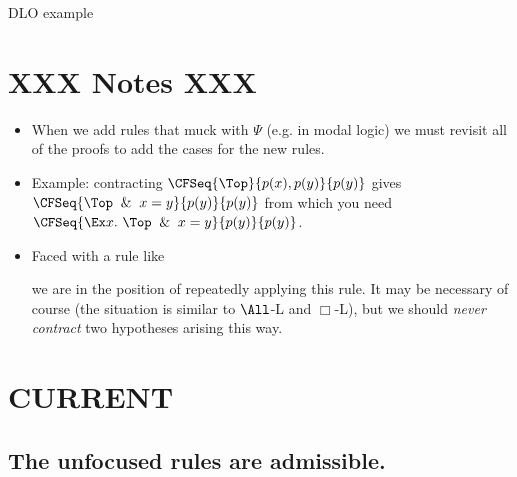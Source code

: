 DLO example



\section{XXX Notes XXX}

\begin{itemize}
\item When we add rules that muck with $\Psi$ (e.g. in modal logic)
  we must revisit all of the proofs to add the cases for the new
  rules.
\item Example: contracting $\CFSeq{\Top}{p(x), p(y)}{p(y)}$
  gives $\CFSeq{\Top\And x=y}{p(y)}{p(y)}$ from which you
  need $\CFSeq{\Ex x.~\Top\And x=y}{p(y)}{p(y)}$.
\item Faced with a rule like
  \Infer
  {}
  {}

  we are in the position of repeatedly applying this rule.
  It may be necessary of course (the situation is similar to
  $\All$-L and $\Box$-L), but we should \emph{never
    contract} two hypotheses arising this way.
\end{itemize}

\section{CURRENT}

\subsection{The unfocused rules are admissible.}




